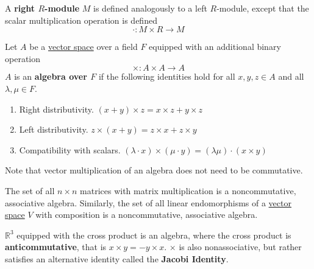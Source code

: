   \begin{definition}
    \label{def:right-r-module}
    A \textbf{right $R$-module} $M$ is defined analogously to a left $R$-module, except that the scalar multiplication operation is defined
    \begin{equation}
      \cdot: M \times R \to M
    \end{equation}
  \end{definition}

  \begin{definition}[Algebra]
    \label{def:algebra}
    Let $A$ be a \hyperref[def:vector-space]{vector space} over a field $F$ equipped with an additional binary operation 
    \begin{equation}
      \times: A \times A \to A
    \end{equation}
    $A$ is an \textbf{algebra over $F$} if the following identities hold for all $x, y, z \in A$ and all $\lambda, \mu \in F$. 
    \begin{enumerate}
      \item Right distributivity. $(x + y) \times z = x \times z + y \times z$ 
      \item Left distributivity. $z \times (x + y) = z \times x + z \times y$
      \item Compatibility with scalars. $(\lambda \cdot x ) \times (\mu \cdot y) = (\lambda \mu) \cdot (x \times y)$ 
    \end{enumerate}
  \end{definition}

  Note that vector multiplication of an algebra does not need to be commutative. 

  \begin{example}
    \label{ex:the-matrix-algebra}
    The set of all $n \times n$ matrices with matrix multiplication is a noncommutative, associative algebra. Similarly, the set of all linear endomorphisms of a \hyperref[def:vector-space]{vector space} $V$ with composition is a noncommutative, associative algebra. 
  \end{example}

  \begin{example}
    \label{ex:r3-with-the-cross-product}
    $\mathbb{R}^3$ equipped with the cross product is an algebra, where the cross product is \textbf{anticommutative}, that is $x \times y = - y \times x$. $\times$ is also nonassociative, but rather satisfies an alternative identity called the \textbf{Jacobi Identity}. 
  \end{example}

